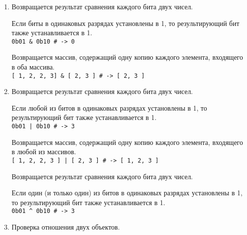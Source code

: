 \begin{enumerate}
  \item %
  \begin{operator}
    Возвращается результат сравнения каждого бита двух чисел.

    Если биты в одинаковых разрядах установлены в 1, то результирующий бит также устанавливается в 1.
    \\\verb!0b01 & 0b10 # -> 0!
  \end{operator}

  \begin{operator}
    Возвращается массив, содержащий одну копию каждого элемента, входящего в оба массива.
    \\\verb![ 1, 2, 2, 3] & [ 2, 3 ] # -> [ 2, 3 ]!
  \end{operator}

  \item %
  \begin{operator}
    Возвращается результат сравнения каждого бита двух чисел.

    Если любой из битов в одинаковых разрядах установлены в 1, то результирующий бит также устанавливается в 1.
    \\\verb!0b01 | 0b10 # -> 3!
  \end{operator}

  \begin{operator}
    Возвращается массив, содержащий одну копию каждого элемента, входящего в любой из массивов.
    \\\verb![ 1, 2, 2, 3 ] | [ 2, 3 ] # -> [ 1, 2, 3 ]!
  \end{operator}

  \begin{operator}
    Возвращается результат сравнения каждого бита двух чисел.

    Если один (и только один) из битов в одинаковых разрядах установлены в 1, то результирующий бит также устанавливается в 1.
    \\\verb!0b01 ^ 0b10 # -> 3!
  \end{operator}

  \item %
  \begin{operator}
    Проверка отношения двух объектов.


\end{operator}
\end{enumerate}
